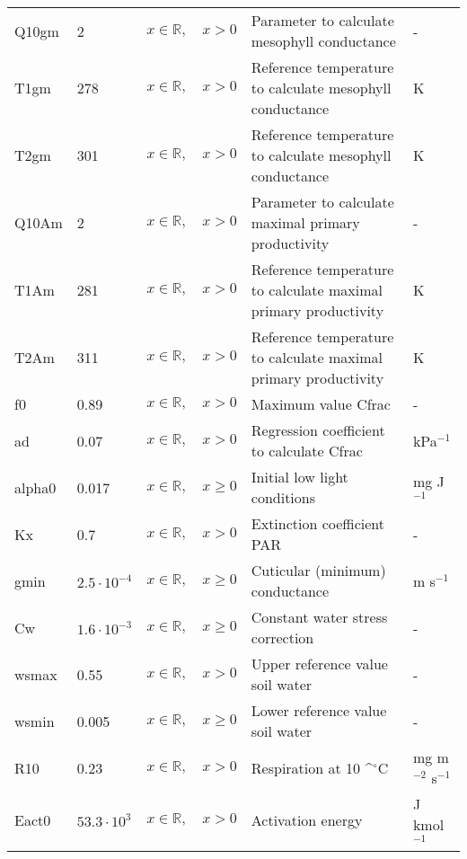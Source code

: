 \documentclass[twoside,11pt,fleqn,a4paper,english,openright]{report}
\def\degrees{\ifmmode^\circ\else$^\circ$\fi}
\begin{document}
\begin{center}
\begin{supertabular}{|l|p{1.6cm}|p{4cm}|p{6.3cm}|l|}
  Q10gm	& 2	& $x \in \mathbb{R}, \quad x > 0$ & Parameter to calculate mesophyll conductance & -\\
  T1gm	&  278	& $x \in \mathbb{R}, \quad x > 0$ & Reference temperature to calculate mesophyll conductance & K \\
  T2gm	&  301	& $x \in \mathbb{R}, \quad x > 0$ & Reference temperature to calculate mesophyll conductance & K \\
  Q10Am	& 2	& $x \in \mathbb{R}, \quad x > 0$ & Parameter to calculate maximal primary productivity & -\\
  T1Am	&  281	& $x \in \mathbb{R}, \quad x > 0$ & Reference temperature to calculate maximal primary productivity & K \\
  T2Am	&  311	& $x \in \mathbb{R}, \quad x > 0$ & Reference temperature to calculate maximal primary productivity & K \\
  f0	& 0.89	& $x \in \mathbb{R}, \quad x > 0$ & Maximum value Cfrac & -\\
  ad	& 0.07	& $x \in \mathbb{R}, \quad x > 0$ & Regression coefficient to calculate Cfrac & kPa$^{-1}$\\
  alpha0& 0.017	& $x \in \mathbb{R}, \quad x \geq 0$ & Initial  low light conditions & mg J$^{-1}$\\
  Kx	& 0.7	& $x \in \mathbb{R}, \quad x > 0$ & Extinction coefficient PAR	& -\\
  gmin	& $2.5 \cdot 10^{-4}$ & $x \in \mathbb{R}, \quad x \geq 0$ & Cuticular (minimum) conductance	& m s$^{-1}$\\
  Cw	& $1.6 \cdot 10^{-3}$	& $x \in \mathbb{R}, \quad x \geq 0$ & Constant water stress correction	& -\\
  wsmax	& 0.55	& $x \in \mathbb{R}, \quad x > 0$	& Upper reference value soil water	& -\\
  wsmin	& 0.005	& $x \in \mathbb{R}, \quad x \geq 0$	& Lower reference value soil water	& -\\
  R10	& 0.23	& $x \in \mathbb{R}, \quad x > 0$ & Respiration at 10 {\degrees}C & mg m$^{-2}$ s$^{-1}$\\
  Eact0	& $53.3\cdot 10^3$ & $x \in \mathbb{R}, \quad x > 0$ & Activation energy & J kmol$^{-1}$\\
\end{supertabular}
\end{center}

\end{document}
